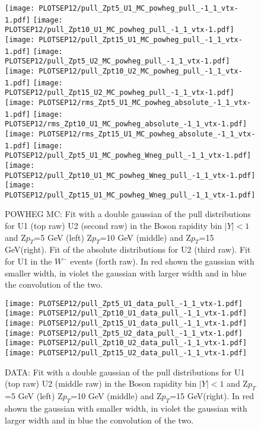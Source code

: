 \documentclass[41pt,a4paper,oneside]{report}
\begin{document}
\begin{figure}[h!]
  \begin{center}
    \texttt{[image: PLOTSEP12/pull\_Zpt5\_U1\_MC\_powheg\_pull\_-1\_1\_vtx-1.pdf]}
    \texttt{[image: PLOTSEP12/pull\_Zpt10\_U1\_MC\_powheg\_pull\_-1\_1\_vtx-1.pdf]}
    \texttt{[image: PLOTSEP12/pull\_Zpt15\_U1\_MC\_powheg\_pull\_-1\_1\_vtx-1.pdf]}
    \texttt{[image: PLOTSEP12/pull\_Zpt5\_U2\_MC\_powheg\_pull\_-1\_1\_vtx-1.pdf]}
    \texttt{[image: PLOTSEP12/pull\_Zpt10\_U2\_MC\_powheg\_pull\_-1\_1\_vtx-1.pdf]}
    \texttt{[image: PLOTSEP12/pull\_Zpt15\_U2\_MC\_powheg\_pull\_-1\_1\_vtx-1.pdf]}
    \texttt{[image: PLOTSEP12/rms\_Zpt5\_U1\_MC\_powheg\_absolute\_-1\_1\_vtx-1.pdf]}
    \texttt{[image: PLOTSEP12/rms\_Zpt10\_U1\_MC\_powheg\_absolute\_-1\_1\_vtx-1.pdf]}
    \texttt{[image: PLOTSEP12/rms\_Zpt15\_U1\_MC\_powheg\_absolute\_-1\_1\_vtx-1.pdf]}
    \texttt{[image: PLOTSEP12/pull\_Zpt5\_U1\_MC\_powheg\_Wneg\_pull\_-1\_1\_vtx-1.pdf]}     
    \texttt{[image: PLOTSEP12/pull\_Zpt10\_U1\_MC\_powheg\_Wneg\_pull\_-1\_1\_vtx-1.pdf]}
    \texttt{[image: PLOTSEP12/pull\_Zpt15\_U1\_MC\_powheg\_Wneg\_pull\_-1\_1\_vtx-1.pdf]}
    \caption{POWHEG MC: Fit with a double gaussian of the pull distributions for U1 (top raw) U2 (second raw) in the Boson rapidity bin $|Y|<1$ and Z$p_{T}$=5 GeV (left) Z$p_{T}$=10 GeV (middle) and Z$p_{T}$=15 GeV(right). Fit of the absolute distributions for U2 (third raw). Fit for U1 in the $W^{-}$ events (forth raw). In red shown the gaussian with smaller width, in violet the gaussian with larger width and in blue the convolution of the two.}
    \label{fig:PullPOW}
  \end{center}
\end{figure}
\begin{figure}[h!]
  \begin{center}
    \texttt{[image: PLOTSEP12/pull\_Zpt5\_U1\_data\_pull\_-1\_1\_vtx-1.pdf]}
    \texttt{[image: PLOTSEP12/pull\_Zpt10\_U1\_data\_pull\_-1\_1\_vtx-1.pdf]}
    \texttt{[image: PLOTSEP12/pull\_Zpt15\_U1\_data\_pull\_-1\_1\_vtx-1.pdf]}
    \texttt{[image: PLOTSEP12/pull\_Zpt5\_U2\_data\_pull\_-1\_1\_vtx-1.pdf]}
    \texttt{[image: PLOTSEP12/pull\_Zpt10\_U2\_data\_pull\_-1\_1\_vtx-1.pdf]}
    \texttt{[image: PLOTSEP12/pull\_Zpt15\_U2\_data\_pull\_-1\_1\_vtx-1.pdf]}
    \caption{DATA: Fit with a double gaussian of the pull distributions for U1 (top raw) U2 (middle raw) in the Boson rapidity bin $|Y|<1$ and Z$p_{T}$=5 GeV (left) Z$p_{T}$=10 GeV (middle) and Z$p_{T}$=15 GeV(right). In red shown the gaussian with smaller width, in violet the gaussian with larger width and in blue the convolution of the two.}
    \label{fig:PullData}
  \end{center}
\end{figure}
\end{document}
